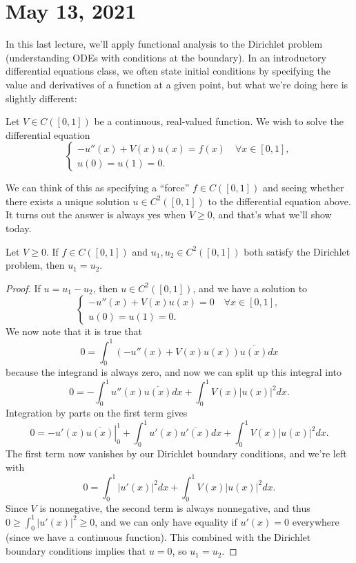 \pagebreak\section*{May 13, 2021}

In this last lecture, we'll apply functional analysis to the Dirichlet problem (understanding ODEs with conditions at the boundary). In an introductory differential equations class, we often state initial conditions by specifying the value and derivatives of a function at a given point, but what we're doing here is slightly different:

\begin{problem}
Let $V \in C([0, 1])$ be a continuous, real-valued function. We wish to solve the differential equation 
\[
    \begin{cases} -u''(x) + V(x) u(x) = f(x) \quad \forall x \in [0, 1], \\ u(0) = u(1) = 0. \end{cases}
\]
\end{problem}

We can think of this as specifying a ``force'' $f \in C([0, 1])$ and seeing whether there exists a unique solution $u \in C^2([0, 1])$ to the differential equation above. It turns out the answer is always yes when $V \ge 0$, and that's what we'll show today. 

\begin{theorem}\label{dirichletuniqueness}
Let $V \ge 0$. If $f \in C([0, 1])$ and $u_1, u_2 \in C^2([0, 1])$ both satisfy the Dirichlet problem, then $u_1 = u_2$.
\end{theorem}
\begin{proof}
If $u = u_1 - u_2$, then $u \in C^2([0, 1])$, and we have a solution to
\[
    \begin{cases} -u''(x) + V(x) u(x) = 0 \quad \forall x \in [0, 1], \\ u(0) = u(1) = 0. \end{cases}
\]
We now note that it is true that
\[
    0 = \int_0^1 \left(-u''(x) + V(x) u(x)\right) \overline{u(x)} dx
\]
because the integrand is always zero, and now we can split up this integral into 
\[
    0 = -\int_0^1 u''(x) \overline{u(x)} dx + \int_0^1 V(x) |u(x)|^2 dx.
\]
Integration by parts on the first term gives 
\[
    0 = \left.-u'(x) \overline{u(x)}\right|^1_0 + \int_0^1 u'(x) \overline{u'(x)} dx + \int_0^1 V(x) |u(x)|^2 dx.
\]
The first term now vanishes by our Dirichlet boundary conditions, and we're left with 
\[
    0 = \int_0^1 |u'(x)|^2 dx + \int_0^1 V(x) |u(x)|^2 dx.
\]
Since $V$ is nonnegative, the second term is always nonnegative, and thus $0 \ge \int_0^1 |u'(x)|^2 \ge 0$, and we can only have equality if $u'(x) = 0$ everywhere (since we have a continuous function). This combined with the Dirichlet boundary conditions implies that $u = 0$, so $u_1 = u_2$.
\end{proof}

